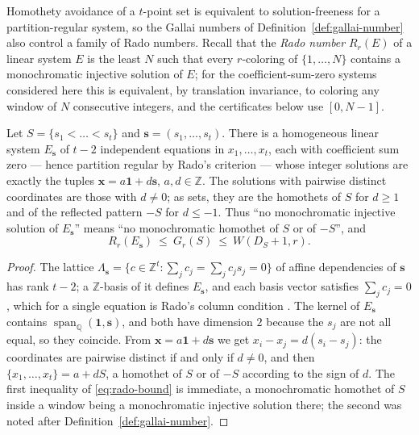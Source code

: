 \documentclass[12pt]{article}
\newcommand{\Wvdw}{W}
\newcommand{\Z}{\mathbb{Z}}
\begin{document}
Homothety avoidance of a $t$-point set is equivalent to
solution-freeness for a partition-regular system, so the Gallai
numbers of Definition~\ref{def:gallai-number} also control a family
of Rado numbers. Recall that the \emph{Rado number} $R_{r}(E)$ of a
linear system $E$ is the least $N$ such that every $r$-coloring of
$\{1,\dots,N\}$ contains a monochromatic injective solution of $E$;
for the coefficient-sum-zero systems considered here this is
equivalent, by translation invariance, to coloring any window of $N$
consecutive integers, and the certificates below use $[0,N-1]$.

\begin{proposition}\label{prop:rado-reading}
Let $S=\{s_{1}<\dots<s_{t}\}$ and $\mathbf{s}=(s_{1},\dots,s_{t})$.
There is a homogeneous linear system $E_{\mathbf{s}}$ of $t-2$
independent equations in $x_{1},\dots,x_{t}$, each with coefficient
sum zero --- hence partition regular by Rado's criterion
\cite{Rado1933} --- whose integer solutions are exactly the tuples
$\mathbf{x}=a\mathbf{1}+d\mathbf{s}$, $a,d\in\Z$. The solutions with
pairwise distinct coordinates are those with $d\ne 0$; as sets, they
are the homothets of $S$ for $d\ge 1$ and of the reflected pattern
$-S$ for $d\le -1$. Thus ``no monochromatic injective solution of
$E_{\mathbf{s}}$'' means ``no monochromatic homothet of $S$ or of
$-S$'', and
\begin{equation}\label{eq:rado-bound}
R_{r}(E_{\mathbf{s}})\ \le\ G_{r}(S)\ \le\ \Wvdw(D_{S}+1,r).
\end{equation}
\end{proposition}

\begin{proof}
The lattice $\Lambda_{\mathbf{s}}=\{c\in\Z^{t}:\sum_{j}c_{j}
=\sum_{j}c_{j}s_{j}=0\}$ of affine dependencies of $\mathbf{s}$ has
rank $t-2$; a $\Z$-basis of it defines $E_{\mathbf{s}}$, and each
basis vector satisfies $\sum_{j}c_{j}=0$, which for a single equation
is Rado's column condition \cite{Rado1933}. The kernel of
$E_{\mathbf{s}}$ contains
$\operatorname{span}_{\mathbb{Q}}(\mathbf{1},\mathbf{s})$, and both
have dimension $2$ because the $s_{j}$ are not all equal, so they
coincide. From $\mathbf{x}=a\mathbf{1}+d\mathbf{s}$ we get
$x_{i}-x_{j}=d(s_{i}-s_{j})$: the coordinates are pairwise distinct
if and only if $d\ne 0$, and then $\{x_{1},\dots,x_{t}\}=a+dS$, a
homothet of $S$ or of $-S$ according to the sign of $d$. The first
inequality of \eqref{eq:rado-bound} is immediate, a monochromatic
homothet of $S$ inside a window being a monochromatic injective
solution there; the second was noted after
Definition~\ref{def:gallai-number}.
\end{proof}
\end{document}
